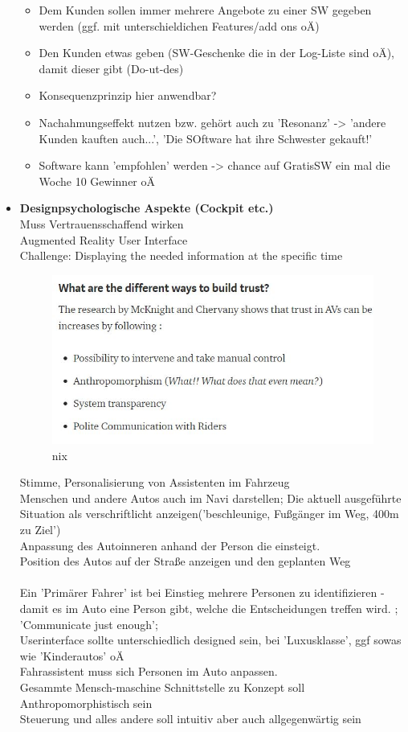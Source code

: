 \begin{itemize}
\begin{itemize}
		\item Dem Kunden sollen immer mehrere Angebote zu einer SW gegeben werden (ggf. mit unterschieldichen Features/add ons oÄ)
		\item Den Kunden etwas geben (SW-Geschenke die in der Log-Liste sind oÄ), damit dieser gibt (Do-ut-des)
		\item Konsequenzprinzip hier anwendbar?
		\item Nachahmungseffekt nutzen bzw. gehört auch zu 'Resonanz' -> 'andere Kunden kauften auch...', 'Die SOftware hat ihre Schwester gekauft!'
		\item Software kann 'empfohlen' werden -> chance auf GratisSW ein mal die Woche 10 Gewinner oÄ
	\end{itemize}
	
	\item \textbf{Designpsychologische Aspekte (Cockpit etc.)}\\
	Muss Vertrauensschaffend wirken\\
	Augmented Reality User Interface\\
	Challenge: Displaying the needed information at the specific time \cite{b16}\\
	\begin{figure}[H]
		\centering
		\includegraphics[width=0.734\columnwidth]{pictures/buildingTrust.jpg}
		\caption{nix}
		\label{img:buildingTrust}
	\end{figure}
	Stimme, Personalisierung von Assistenten im Fahrzeug\\
	Menschen und andere Autos auch im Navi darstellen; Die aktuell ausgeführte Situation als verschriftlicht anzeigen('beschleunige, Fußgänger im Weg, 400m zu Ziel')\\
	Anpassung des Autoinneren anhand der Person die einsteigt.\\
	Position des Autos auf der Straße anzeigen und den geplanten Weg\\
	\cite{b17}\\
	Ein 'Primärer Fahrer' ist bei Einstieg mehrere Personen zu identifizieren - damit es im Auto eine Person gibt, welche die Entscheidungen treffen wird. \cite{b18}; 'Communicate just enough';\\
	Userinterface sollte unterschiedlich designed sein, bei 'Luxusklasse', ggf sowas wie 'Kinderautos' oÄ\\
	Fahrassistent muss sich Personen im Auto anpassen.\\
	Gesammte Mensch-maschine Schnittstelle zu Konzept soll Anthropomorphistisch sein\\
	Steuerung und alles andere soll intuitiv aber auch allgegenwärtig sein\\
	

\end{itemize}
